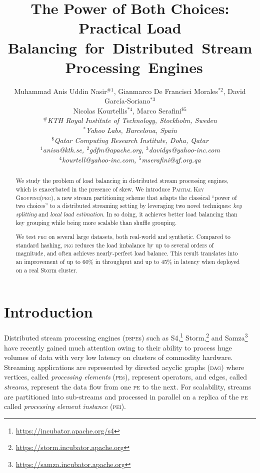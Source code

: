 \documentclass[10pt,conference,letterpaper]{IEEEtran}
\title{The Power of Both Choices: Practical Load Balancing~for~Distributed~Stream~Processing~Engines}
\author{{Muhammad Anis Uddin Nasir{\small $^{\#1}$},
Gianmarco De Francisci Morales{\small $^{*2}$},
David Garc\'ia-Soriano{\small $^{*3}$}}\\
{Nicolas Kourtellis{\small $^{*4}$},
Marco Serafini{\small $^{\$5}$} }
\vspace{1.6mm}\\
\fontsize{10}{10}\selectfont\itshape
$^{\#}$KTH Royal Institute of Technology, Stockholm, Sweden\\
$^{*}$Yahoo Labs, Barcelona, Spain\\
$^{\$}$Qatar Computing Research Institute, Doha, Qatar\\
\fontsize{9}{9}\selectfont\ttfamily\upshape
$^{1}$anisu@kth.se,
$^{2}$gdfm@apache.org,
$^{3}$davidgs@yahoo-inc.com\\
$^{4}$kourtell@yahoo-inc.com,
$^{5}$mserafini@qf.org.qa
}
\newcommand{\pei}{\textsc{pei}\xspace}
\newcommand{\pe}{\textsc{pe}\xspace}
\newcommand{\pes}{{\pe}s\xspace}
\newcommand{\dspe}{\textsc{dspe}\xspace}
\newcommand{\dspes}{{\dspe}s\xspace}
\newcommand{\dagr}{\textsc{dag}\xspace}
\newcommand{\pkg}{\textsc{Partial Key Grouping}\xspace}
\newcommand{\pkgs}{\textsc{pkg}\xspace}
\begin{document}
\maketitle
\begin{abstract}


We study the problem of load balancing in distributed stream processing engines, which is exacerbated in the presence of skew.
We introduce \pkg (\pkgs), a new stream partitioning scheme that adapts the classical ``power of two choices'' to a distributed streaming setting by leveraging two novel techniques: \emph{key splitting} and \emph{local load estimation}.
In so doing, it achieves better load balancing than key grouping while being more scalable than shuffle grouping.



We test \pkgs on several large datasets, both real-world and synthetic.
Compared to standard hashing, \pkgs reduces the load imbalance by up to several orders of magnitude, and often achieves nearly-perfect load balance.
This result translates into an improvement of up to 60\% in throughput and up to 45\% in latency when deployed on a real Storm cluster.
\end{abstract}

\section{Introduction}
\label{sec:intro}









Distributed stream processing engines (\dspes) such as S4,\footnote{\url{https://incubator.apache.org/s4}} Storm,\footnote{\url{https://storm.incubator.apache.org}} and Samza\footnote{\url{https://samza.incubator.apache.org}} have recently gained much attention owing to their ability to process huge volumes of data with very low latency on clusters of commodity hardware.
Streaming applications are represented by directed acyclic graphs (\dagr) where vertices, called \emph{processing elements} (\pes), represent operators, and edges, called \emph{streams}, represent the data flow from one \pe to the next.
For scalability, streams are partitioned into sub-streams and processed in parallel on a replica of the \pe called \emph{processing element instance} (\pei).
\end{document}
